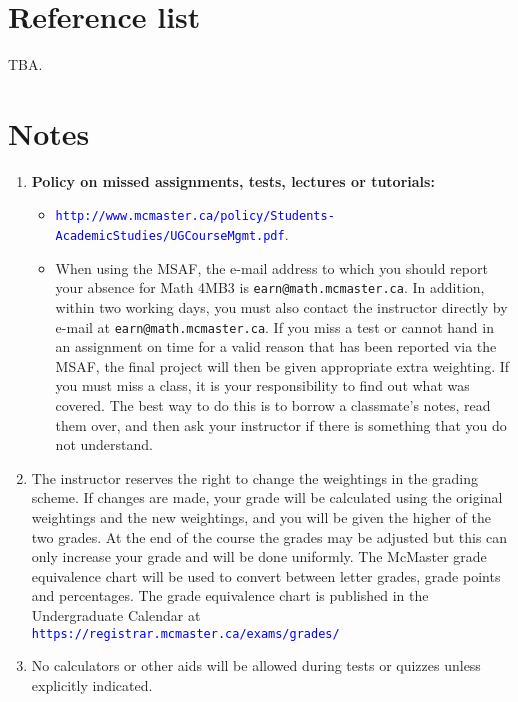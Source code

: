 \documentclass[12pt]{article}
\newcommand{\url}[1]{{\tt\textcolor{blue}{#1}}}
\begin{document}
\section*{Reference list}

TBA. 

\section*{Notes}

\begin{enumerate}\addtolength{\itemsep}{-0.5\baselineskip}

\item {\bf Policy on missed assignments, tests, lectures or tutorials:} 
\begin{itemize}
\item \url{http://www.mcmaster.ca/policy/Students-AcademicStudies/UGCourseMgmt.pdf}.
\item When using the MSAF, the e-mail address to which you should report your absence for Math 4MB3 is {\tt earn@math.mcmaster.ca}.  In addition, within two working days, you must also contact the instructor directly by e-mail at {\tt earn@math.mcmaster.ca}.  If you miss a test or cannot hand in an assignment on time for a valid reason that has been reported via the MSAF, the final project will then be given appropriate extra weighting.  If you must miss a class, it is your responsibility to find out what was covered.  The best way to do this is to borrow a classmate's notes, read them over, and then ask your instructor if there is something that you do not understand.
\end{itemize}

\item The instructor reserves the right to change the weightings in the grading scheme. If changes are made, your grade will be calculated using the original weightings and the new weightings, and you will be given the higher of the two grades.  At the end of the course the grades may be adjusted but this can only increase your grade and will be done uniformly.  The McMaster grade equivalence chart will be used to convert between letter grades, grade points and percentages.  The grade equivalence chart is published in the Undergraduate Calendar at \url{https://registrar.mcmaster.ca/exams/grades/}

\item No calculators or other aids will be allowed during tests or quizzes unless explicitly indicated.


\end{enumerate}
\end{document}
